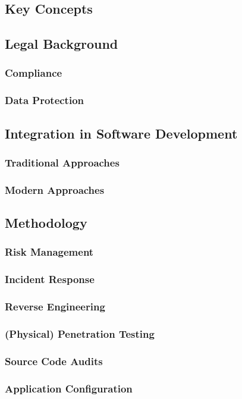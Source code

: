 \subsection{Key Concepts} %
\subsection{Legal Background} %
\subsubsection{Compliance}
\subsubsection{Data Protection}
\subsection{Integration in Software Development}
\subsubsection{Traditional Approaches}
\subsubsection{Modern Approaches}
\subsection{Methodology}
\subsubsection{Risk Management}
\subsubsection{Incident Response}
\subsubsection{Reverse Engineering} %
\subsubsection{(Physical) Penetration Testing} %
\subsubsection{Source Code Audits}
\subsubsection{Application Configuration}